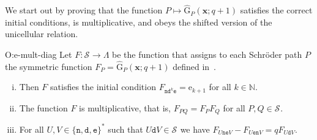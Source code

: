 \documentclass[reqno]{amsart}
\newcommand{\myi}[1]{\item\label{Item:#1}}
\newcommand{\setN}{\mathbb{N}}
\newcommand{\xvec}{\mathbf{x}}
\newcommand{\estep}{\texttt{e}}
\newcommand{\dstep}{\texttt{d}}
\newcommand{\nstep}{\texttt{n}}
\newcommand{\elementaryE}{\mathrm{e}}
\newcommand{\LLTe}{\hat{\mathrm{G}}} %
\newcommand{\SCH}[1]{\mathcal{S}_{#1}}     %
\begin{document}
We start out by proving that the function $P\mapsto\LLTe_P(\xvec;q+1)$ satisfies the correct initial conditions, is multiplicative, 
and obeys the shifted version of the unicellular relation.
%
\begin{prop}{O:e-mult-diag}
Let $F:\SCH{}\to\Lambda$ be the function that assigns to 
each Schr{\"o}der path $P$ the symmetric function $F_P=\LLTe_P(\xvec;q+1)$ defined in~.
\begin{enumerate}[(i)]
\myi{O:e-mult-diag:e}
Then $F$ satisfies the initial condition $F_{\nstep\dstep^k\estep}=\elementaryE_{k+1}$ for all $k\in\setN$.

\myi{O:e-mult-diag:mult}
The function $F$ is multiplicative, that is, $F_{PQ}=F_P F_Q$ for all $P,Q\in\SCH{}$.

\myi{O:e-mult-diag:diag}
For all $U,V\in\{\nstep,\dstep,\estep\}^*$ such that $U\dstep V\in\SCH{}$ we have
$F_{U\nstep\estep V} - F_{U\estep\nstep V} = q F_{U\dstep V}$.
\end{enumerate}
\end{prop}
\end{document}
